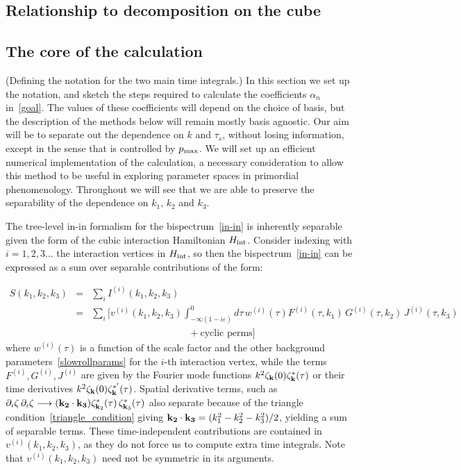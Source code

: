     \subsection{Relationship to decomposition on the cube}
    \subsection{The core of the calculation}
    (Defining the notation for the two main time integrals.)
    In this section we set up the notation, and sketch the steps required to calculate the
coefficients $\alpha_n$ in~\eqref{goal}.
The values of these coefficients will depend on the choice
of basis, but the description of the methods below will remain mostly basis agnostic.
Our aim will be to separate out the dependence on $k$ and $\tau_s$,
without losing information, except in the sense that is controlled by $p_\text{max}$.
We will set up an efficient numerical implementation of the calculation,
a necessary consideration to allow this method to be useful in exploring
parameter spaces in primordial phenomenology.
Throughout we will see that we are able to preserve the
separability of the dependence on $k_1$, $k_2$ and $k_3$.


The tree-level in-in formalism for the bispectrum~\eqref{in-in} is inherently separable given
the form of the cubic interaction Hamiltonian $H_{\rm int}$.
Consider indexing with ${i=1,2,3...}$ the interaction vertices in $H_{\rm int}$,
so then the bispectrum~\eqref{in-in} can be expressed as a sum over separable contributions of the form:


\begin{eqnarray}\label{inin_sep}
S(k_1, k_2,k_3) &=& \sum_i I^{(i)} (k_1, k_2,k_3)\nonumber \\
    &=& \sum_i \bigg[ v^{(i)}(k_1, k_2,k_3) \int^0_{-\infty(1-i\varepsilon)} d\tau\, w^{(i)}(\tau) F^{(i)}(\tau,k_1)\, G^{(i)}(\tau,k_2)\,J^{(i)}(\tau,k_3)\nonumber\\
    &&\quad\quad\quad\quad\quad\quad\quad\quad\quad\quad+ \text{cyclic perms}  \bigg] 
\end{eqnarray}
where $w^{(i)}(\tau)$ is a function of the scale factor and the other background parameters~\eqref{slowrollparams} for the $i$-th interaction vertex, while the terms $F^{(i)}, G^{(i)}, J^{(i)}$ are given by the Fourier mode functions $k^2\zeta_{\bf k}(0)\zeta^{*}_{\bf k}(\tau)$ or their time derivatives $k^2\zeta_{\bf k}(0)\zeta^{*'}_{\bf k}(\tau)$.
Spatial derivative terms, such as  $\partial_i \zeta\, \partial_i\zeta \longrightarrow ({\bf k_2}\cdot {\bf k_3} )\zeta_{{\bf k}_2}^*(\tau)\, \zeta_{{\bf k}_3}^*(\tau)$ also separate because of the triangle condition~\eqref{triangle_condition} giving  ${\bf k_2}\cdot {\bf k_3} = (k_1^2 - k_2^2-k_3^2)/2$, yielding a sum of separable terms.
These time-independent contributions are contained in $v^{(i)}(k_1, k_2,k_3)$,
as they do not force us to compute extra time integrals.
Note that $v^{(i)}(k_1, k_2,k_3)$ need not be symmetric in its arguments.

